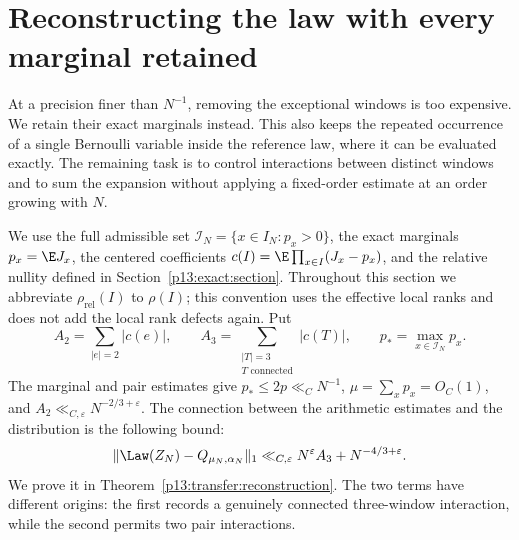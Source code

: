 \section{Reconstructing the law with every marginal retained}
\label{p13:transfer:section}

At a precision finer than $N^{-1}$, removing the exceptional windows is
too expensive. We retain their exact marginals instead. This also keeps
the repeated occurrence of a single Bernoulli variable inside the
reference law, where it can be evaluated exactly. The remaining task is
to control interactions between distinct windows and to sum the expansion
without applying a fixed-order estimate at an order growing with $N$.

We use the full admissible set $\mathcal I_N=\{x\in I_N:p_x>0\}$,
the exact marginals $p_x=\E J_x$, the centered coefficients
$c(I)=\E\prod_{x\in I}(J_x-p_x)$, and the relative nullity defined in
Section~\ref{p13:exact:section}. Throughout this section we abbreviate
$\rho_{\mathrm{rel}}(I)$ to $\rho(I)$; this convention uses the effective
local ranks and does not add the local rank defects again. Put
\[
 A_2=\sum_{|e|=2}|c(e)|,\qquad
 A_3=\sum_{\substack{|T|=3\\T\text{ connected}}}|c(T)|,
 \qquad p_* =\max_{x\in\mathcal I_N}p_x.
\]
The marginal and pair estimates give
$p_*\leq2p\ll_C N^{-1}$, $\mu=\sum_xp_x=O_C(1)$, and
$A_2\ll_{C,\varepsilon}N^{-2/3+\varepsilon}$.
The connection between the arithmetic estimates and the distribution is
the following bound:
\begin{equation}
 \|\Law(Z_N)-Q_{\mu_N,\alpha_N}\|_1
 \ll_{C,\varepsilon}N^\varepsilon A_3+N^{-4/3+\varepsilon}.
 \label{p13:transfer:announced-bound}
\end{equation}
We prove it in Theorem~\ref{p13:transfer:reconstruction}. The two terms
have different origins: the first records a genuinely connected
three-window interaction, while the second permits two pair interactions.

